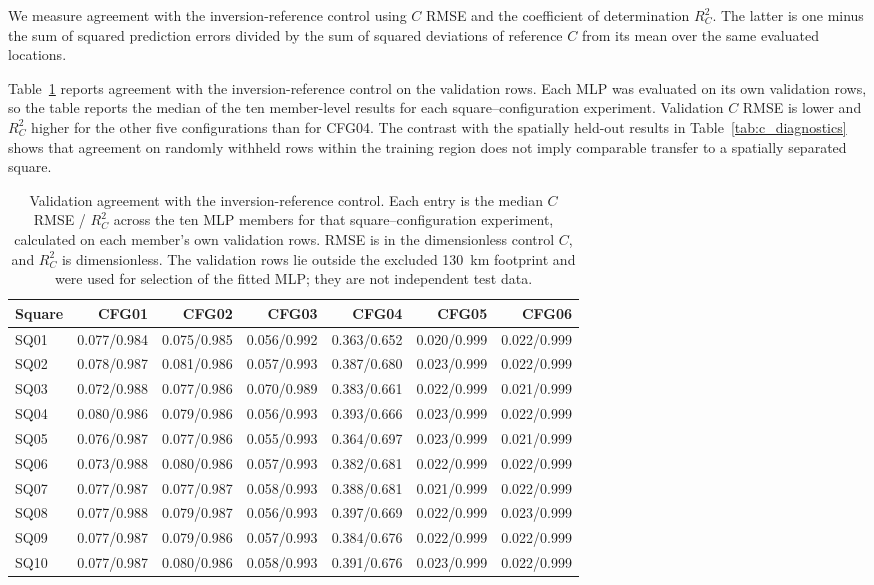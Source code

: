 \documentclass[review,jog]{igs}
\providecommand{\toprule}{\hline}
\providecommand{\midrule}{\hline}
\providecommand{\bottomrule}{\hline}
\begin{document}
We measure agreement with the inversion-reference control using $C$ RMSE and the coefficient of determination $R_C^2$. The latter is one minus the sum of squared prediction errors divided by the sum of squared deviations of reference $C$ from its mean over the same evaluated locations.

Table~\ref{tab:validation_c_diagnostics} reports agreement with the inversion-reference control on the validation rows. Each MLP was evaluated on its own validation rows, so the table reports the median of the ten member-level results for each square--configuration experiment. Validation $C$ RMSE is lower and $R_C^2$ higher for the other five configurations than for CFG04. The contrast with the spatially held-out results in Table~\ref{tab:c_diagnostics} shows that agreement on randomly withheld rows within the training region does not imply comparable transfer to a spatially separated square.

\begin{table}
\caption{Validation agreement with the inversion-reference control. Each
entry is the median $C$ RMSE / $R_C^2$ across the ten MLP members for that
square--configuration experiment, calculated on each member's own validation
rows. RMSE is in the dimensionless control $C$, and $R_C^2$ is dimensionless.
The validation rows lie outside the excluded 130~km footprint and were used for selection of the fitted MLP; they are not independent test data.}
\label{tab:validation_c_diagnostics}
\centering
\scriptsize
\setlength{\tabcolsep}{4pt}
\begin{tabular}{lrrrrrr}
\toprule
Square & CFG01 & CFG02 & CFG03 & CFG04 & CFG05 & CFG06\\
\midrule
SQ01 & 0.077/0.984 & 0.075/0.985 & 0.056/0.992 & 0.363/0.652 & 0.020/0.999 & 0.022/0.999 \\
SQ02 & 0.078/0.987 & 0.081/0.986 & 0.057/0.993 & 0.387/0.680 & 0.023/0.999 & 0.022/0.999 \\
SQ03 & 0.072/0.988 & 0.077/0.986 & 0.070/0.989 & 0.383/0.661 & 0.022/0.999 & 0.021/0.999 \\
SQ04 & 0.080/0.986 & 0.079/0.986 & 0.056/0.993 & 0.393/0.666 & 0.023/0.999 & 0.022/0.999 \\
SQ05 & 0.076/0.987 & 0.077/0.986 & 0.055/0.993 & 0.364/0.697 & 0.023/0.999 & 0.021/0.999 \\
SQ06 & 0.073/0.988 & 0.080/0.986 & 0.057/0.993 & 0.382/0.681 & 0.022/0.999 & 0.022/0.999 \\
SQ07 & 0.077/0.987 & 0.077/0.987 & 0.058/0.993 & 0.388/0.681 & 0.021/0.999 & 0.022/0.999 \\
SQ08 & 0.077/0.988 & 0.079/0.987 & 0.056/0.993 & 0.397/0.669 & 0.022/0.999 & 0.023/0.999 \\
SQ09 & 0.077/0.987 & 0.079/0.986 & 0.057/0.993 & 0.384/0.676 & 0.022/0.999 & 0.022/0.999 \\
SQ10 & 0.077/0.987 & 0.080/0.986 & 0.058/0.993 & 0.391/0.676 & 0.023/0.999 & 0.022/0.999 \\
\bottomrule
\end{tabular}
\end{table}
\end{document}
